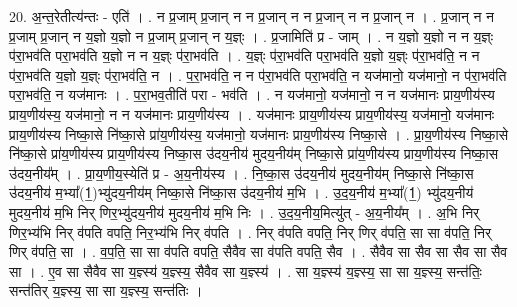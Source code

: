 \documentclass[17pt]{extarticle}
\begin{document}
20. अ॒न्त॒रेतीत्य॑न्तः - एति॑ । . न प्र॒जाम् प्र॒जान् न न प्र॒जान् न न प्र॒जान् न न प्र॒जान् न । . प्र॒जान् न न प्र॒जाम् प्र॒जान् न य॒ज्ञो य॒ज्ञो न प्र॒जाम् प्र॒जान् न य॒ज्ञ्ः । . प्र॒जामिति॑ प्र - जाम् । . न य॒ज्ञो य॒ज्ञो न न य॒ज्ञ्ः प॑रा॒भव॑ति परा॒भव॑ति य॒ज्ञो न न य॒ज्ञ्ः प॑रा॒भव॑ति । . य॒ज्ञ्ः प॑रा॒भव॑ति परा॒भव॑ति य॒ज्ञो य॒ज्ञ्ः प॑रा॒भव॑ति॒ न न प॑रा॒भव॑ति य॒ज्ञो य॒ज्ञ्ः प॑रा॒भव॑ति॒ न । . प॒रा॒भव॑ति॒ न न प॑रा॒भव॑ति परा॒भव॑ति॒ न यज॑मानो॒ यज॑मानो॒ न प॑रा॒भव॑ति परा॒भव॑ति॒ न यज॑मानः । . प॒रा॒भव॒तीति॑ परा - भव॑ति । . न यज॑मानो॒ यज॑मानो॒ न न यज॑मानः प्राय॒णीय॑स्य प्राय॒णीय॑स्य॒ यज॑मानो॒ न न यज॑मानः प्राय॒णीय॑स्य । . यज॑मानः प्राय॒णीय॑स्य प्राय॒णीय॑स्य॒ यज॑मानो॒ यज॑मानः प्राय॒णीय॑स्य निष्का॒से नि॑ष्का॒से प्रा॑य॒णीय॑स्य॒ यज॑मानो॒ यज॑मानः प्राय॒णीय॑स्य निष्का॒से । . प्रा॒य॒णीय॑स्य निष्का॒से नि॑ष्का॒से प्रा॑य॒णीय॑स्य प्राय॒णीय॑स्य निष्का॒स उ॑दय॒नीय॑ मुदय॒नीय॑म् निष्का॒से प्रा॑य॒णीय॑स्य प्राय॒णीय॑स्य निष्का॒स उ॑दय॒नीय᳚म् । . प्रा॒य॒णीय॒स्येति॑ प्र - अ॒य॒नीय॑स्य । . नि॒ष्का॒स उ॑दय॒नीय॑ मुदय॒नीय॑म् निष्का॒से नि॑ष्का॒स उ॑दय॒नीय॑ म॒भ्या᳚(1॒)भ्यु॑दय॒नीय॑म् निष्का॒से नि॑ष्का॒स उ॑दय॒नीय॑ म॒भि । . उ॒द॒य॒नीय॑ म॒भ्या᳚(1॒) भ्यु॑दय॒नीय॑ मुदय॒नीय॑ म॒भि निर् णिर॒भ्यु॑दय॒नीय॑ मुदय॒नीय॑ म॒भि निः । . उ॒द॒य॒नीय॒मित्यु॑त् - अ॒य॒नीय᳚म् । . अ॒भि निर् णिर॒भ्य॑भि निर् व॑पति वपति॒ निर॒भ्य॑भि निर् व॑पति । . निर् व॑पति वपति॒ निर् णिर् व॑पति॒ सा सा व॑पति॒ निर् णिर् व॑पति॒ सा । . व॒प॒ति॒ सा सा व॑पति वपति॒ सैवैव सा व॑पति वपति॒ सैव । . सैवैव सा सैव सा सैव सा सैव सा । . ए॒व सा सैवैव सा य॒ज्ञ्स्य॑ य॒ज्ञ्स्य॒ सैवैव सा य॒ज्ञ्स्य॑ । . सा य॒ज्ञ्स्य॑ य॒ज्ञ्स्य॒ सा सा य॒ज्ञ्स्य॒ सन्त॑तिः॒ सन्त॑तिर् य॒ज्ञ्स्य॒ सा सा य॒ज्ञ्स्य॒ सन्त॑तिः । \newline
\end{document}
